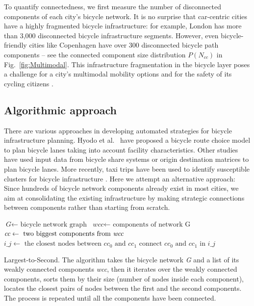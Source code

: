 To quantify connectedness, we first measure the number of disconnected components of each city's bicycle network. It is no surprise that car-centric cities have a highly fragmented bicycle infrastructure: for example, London has more than 3,000 disconnected bicycle infrastructure segments. However, even bicycle-friendly cities like Copenhagen have over 300 disconnected bicycle path components -- see the connected component size distribution $P( N_{cc} )$ in Fig.~\ref{fig:Multimodal}. This infrastructure fragmentation in the bicycle layer poses a challenge for a city's multimodal mobility options \cite{natera2020multimodal} and for the safety of its cycling citizens \cite{Dill2009infrastructure,Chataway2014Safety}.

\subsection{Algorithmic approach}

There are various approaches in developing automated strategies for bicycle infrastructure planning. Hyodo et al.~\cite{Hyodo2000Modeling} have proposed a bicycle route choice model to plan bicycle lanes taking into account facility characteristics. Other studies have used input data from bicycle share systems \cite{Bao2017Planning} or origin destination matrices \cite{Mauttone2017Design} to plan bicycle lanes. More recently, taxi trips have been used to identify susceptible clusters for bicycle infrastructure \cite{Akbarzadeh2018Design}. Here we attempt an alternative approach: Since hundreds of bicycle network components already exist in most cities, we aim at consolidating the existing infrastructure by making strategic connections between components rather than starting from scratch.


\begin{algorithm}[h!]
  \begin{algorithmic}[1]
    \State $\textit{G} \gets \text{ bicycle network graph}$
    \State $\textit{wcc} \gets \text{ components of network G}$
    \State  {}
    \State $\textit{cc} \gets \text{ two biggest components from \textit{wcc}}$
    \State $\textit{i\_j} \gets \text{ the closest nodes between } cc_0 \text{ and } cc_1$
    \State $\text{connect } cc_0 \text{ and } cc_1 \text{ in } i\_j$
    \EndFor
    \EndProcedure
  \end{algorithmic}
  \caption{Largest-to-Second. The algorithm takes the bicycle network \textit{G} and a list of its weakly connected components \textit{wcc}, then it iterates over the weakly connected components, sorts them by their size (number of nodes inside each component), locates the closest pairs of nodes between the first and the second components. The process is repeated until all the components have been connected.}\label{al:L2S}
\end{algorithm}

